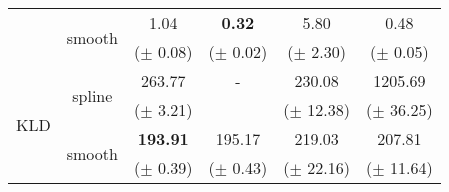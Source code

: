 \documentclass{article}
\begin{document}
\begin{table}[htbp]
\begin{tabular}{lccccc}
        \cmidrule(lr){2-6}
        & \multirow{2}{*}{smooth} & 1.04  & \textbf{0.32}  & 5.80  & 0.48   \\
        &&($\pm$ 0.08)& ($\pm$ 0.02)& ($\pm$ 2.30) & ($\pm$ 0.05)\\
        \cmidrule(lr){2-6}
        \multirow{4}{*}{KLD} & \multirow{2}{*}{spline}& 263.77 & - & 230.08  & 1205.69 \\
        &&  ($\pm$ 3.21) & & ($\pm$ 12.38) & ($\pm$ 36.25) \\
        \cmidrule(lr){2-6}
            & \multirow{2}{*}{smooth} & \textbf{193.91}  & 195.17  & 219.03  & 207.81 \\
        && ($\pm$ 0.39) & ($\pm$ 0.43) & ($\pm$ 22.16) & ($\pm$ 11.64)\\
    \bottomrule
    \end{tabular}
\end{table}
\end{document}
